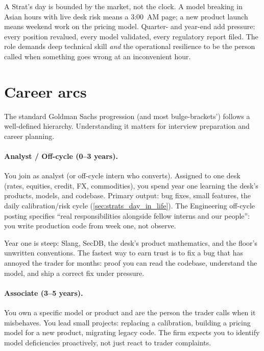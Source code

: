 \begin{pitfallbox}
A Strat's day is bounded by the market, not the clock.  A model
breaking in Asian hours with live desk risk means a 3:00~AM page;
a new product launch means weekend work on the pricing model.
Quarter- and year-end add pressure: every position revalued, every
model validated, every regulatory report filed.  The role demands
deep technical skill \emph{and} the operational resilience to be
the person called when something goes wrong at an inconvenient hour.
\end{pitfallbox}

\section{Career arcs}
\label{sec:strats_career}

The standard Goldman Sachs progression (and most bulge-brackets')
follows a well-defined hierarchy.  Understanding it matters for
interview preparation and career planning.

\paragraph{Analyst / Off-cycle (0--3 years).}
You join as analyst (or off-cycle intern who converts).  Assigned
to one desk (rates, equities, credit, FX, commodities), you spend
year one learning the desk's products, models, and codebase.
Primary output: bug fixes, small features, the daily
calibration/risk cycle (\cref{sec:strats_day_in_life}).  The
Engineering off-cycle posting specifies ``real responsibilities
alongside fellow interns and our people'': you write production
code from week one, not observe.

Year one is steep: Slang, SecDB, the desk's product mathematics,
and the floor's unwritten conventions.  The fastest way to earn
trust is to fix a bug that has annoyed the trader for months:
proof you can read the codebase, understand the model, and ship a
correct fix under pressure.

\paragraph{Associate (3--5 years).}
You own a specific model or product and are the person the trader
calls when it misbehaves.  You lead small projects: replacing a
calibration, building a pricing model for a new product, migrating
legacy code.  The firm expects you to identify model deficiencies
proactively, not just react to trader complaints.

